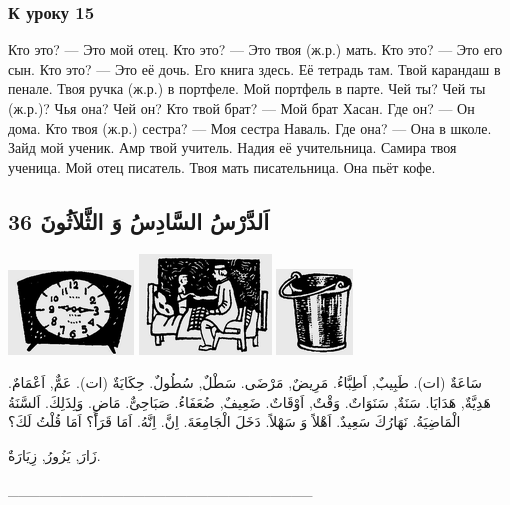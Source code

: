 \documentclass[a5paper]{article}
\begin{document}
\subsubsection{К уроку 15}
Кто это? — Это мой отец. Кто это? — Это твоя (ж.р.) мать. Кто это? — Это его сын. Кто это? — Это её дочь. Его книга здесь. Её тетрадь там. Твой карандаш в пенале. Твоя ручка (ж.р.) в портфеле. Мой портфель в парте. Чей ты? Чей ты (ж.р.)? Чья она? Чей он? Кто твой брат? — Мой брат Хасан. Где он? — Он дома. Кто твоя (ж.р.) сестра? — Моя сестра Наваль. Где она? — Она в школе. Зайд мой ученик. Амр твой учитель. Надия её учительница. Самира твоя ученица. Мой отец писатель. Твоя мать писательница. Она пьёт кофе.

\subsection{اَلدَّرْسُ السَّادِسُ وَ الثَّلاَثُونَ 36}
 \includegraphics[width=1.3126in,height=0.8854in]{MuhammadBagauddinlatinized-img084.png}   \includegraphics[width=1.3854in,height=1.052in]{MuhammadBagauddinlatinized-img085.png}   \includegraphics[width=0.802in,height=0.8957in]{MuhammadBagauddinlatinized-img086.png} 

سَاعَةٌ (ات). طَبِيبٌ, اَطِبَّاءُ. مَرِيضٌ, مَرْضَى. سَطْلٌ, سُطُولٌ. حِكَايَةٌ (ات). عَمٌّ, اَعْمَامٌ. هَدِيَّةٌ, هَدَايَا. سَنَةٌ, سَنَوَاتٌ. وَقْتٌ, اَوْقَاتٌ. ضَعِيفٌ, ضُعَفَاءُ. صَبَاحِىٌّ. مَاضٍ. وَلِذَلِكَ. اَلسَّنَةُ الْمَاضِيَةُ. نَهَارُكَ سَعِيدٌ. اَهْلاً وَ سَهْلاً. دَخَلَ الْجَامِعَةَ. اِنَّ. اِنَّهُ. اَمَا قَرَأَ؟ اَمَا قُلْتُ لَكَ؟ 

زَارَ, يَزُورُ, زِيَارَةٌ.

\_\_\_\_\_\_\_\_\_\_\_\_\_\_\_\_\_\_\_\_\_\_\_\_\_\_\_\_\_
\end{document}
